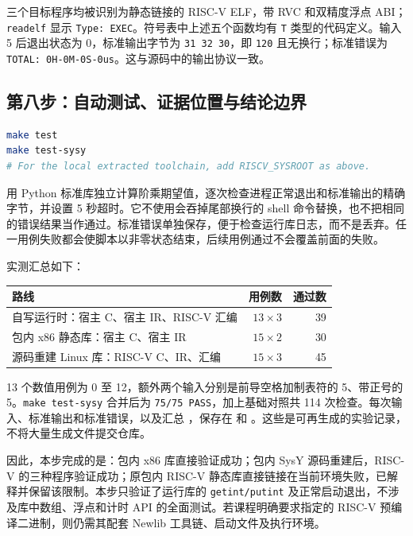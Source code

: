 \documentclass[UTF8,a4paper,12pt]{ctexart}
\begin{document}
三个目标程序均被识别为静态链接的 RISC-V ELF，带 RVC 和双精度浮点 ABI；\texttt{readelf} 显示 \texttt{Type: EXEC}。符号表中上述五个函数均有 \texttt{T} 类型的代码定义。输入 5 后退出状态为 0，标准输出字节为 \texttt{31 32 30}，即 \texttt{120} 且无换行；标准错误为 \texttt{TOTAL: 0H-0M-0S-0us}。这与源码中的输出协议一致。

\subsection{第八步：自动测试、证据位置与结论边界}

\begin{lstlisting}[language=bash]
make test
make test-sysy
# For the local extracted toolchain, add RISCV_SYSROOT as above.
\end{lstlisting}

 用 Python 标准库独立计算阶乘期望值，逐次检查进程正常退出和标准输出的精确字节，并设置 5 秒超时。它不使用会吞掉尾部换行的 shell 命令替换，也不把相同的错误结果当作通过。标准错误单独保存，便于检查运行库日志，而不是丢弃。任一用例失败都会使脚本以非零状态结束，后续用例通过不会覆盖前面的失败。

实测汇总如下：

\begin{center}
\begin{tabular}{p{7.0cm}rr}
\toprule
路线 & 用例数 & 通过数 \\
\midrule
自写运行时：宿主 C、宿主 IR、RISC-V 汇编 & $13\times3$ & 39 \\
包内 x86 静态库：宿主 C、宿主 IR & $15\times2$ & 30 \\
源码重建 Linux 库：RISC-V C、IR、汇编 & $15\times3$ & 45 \\
\bottomrule
\end{tabular}
\end{center}

13 个数值用例为 0 至 12，额外两个输入分别是前导空格加制表符的 5、带正号的 5。\texttt{make test-sysy} 合并后为 \texttt{75/75 PASS}，加上基础对照共 114 次检查。每次输入、标准输出和标准错误，以及汇总 ，保存在  和 。这些是可再生成的实验记录，不将大量生成文件提交仓库。

因此，本步完成的是：包内 x86 库直接验证成功；包内 SysY 源码重建后，RISC-V 的三种程序验证成功；原包内 RISC-V 静态库直接链接在当前环境失败，已解释并保留该限制。本步只验证了运行库的 \texttt{getint/putint} 及正常启动退出，不涉及库中数组、浮点和计时 API 的全面测试。若课程明确要求指定的 RISC-V 预编译二进制，则仍需其配套 Newlib 工具链、启动文件及执行环境。
\end{document}
